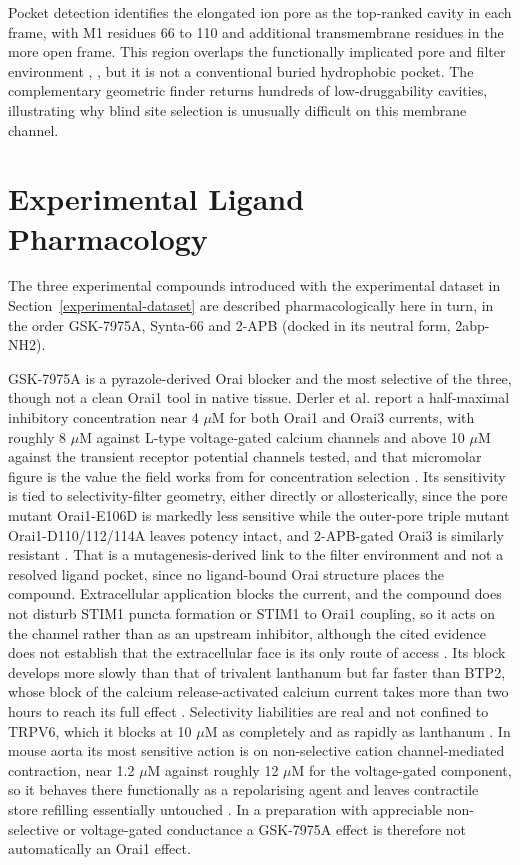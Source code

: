Pocket detection identifies the elongated ion pore as the top-ranked cavity in each frame, with M1 residues 66 to 110 and additional transmembrane residues in the more open frame. This region overlaps the functionally implicated pore and filter environment \cite{ref070}, \cite{ref071}, but it is not a conventional buried hydrophobic pocket. The complementary geometric finder returns hundreds of low-druggability cavities, illustrating why blind site selection is unusually difficult on this membrane channel.

\hypertarget{experimental-ligand-pharmacology}{%
\chapter{Experimental Ligand Pharmacology}\label{experimental-ligand-pharmacology}}

The three experimental compounds introduced with the experimental dataset in Section~\ref{experimental-dataset} are described pharmacologically here in turn, in the order GSK-7975A, Synta-66 and 2-APB (docked in its neutral form, 2abp-NH2).

GSK-7975A is a pyrazole-derived Orai blocker and the most selective of the three, though not a clean Orai1 tool in native tissue. Derler et al. report a half-maximal inhibitory concentration near 4 \ensuremath{\mu}M for both Orai1 and Orai3 currents, with roughly 8 \ensuremath{\mu}M against L-type voltage-gated calcium channels and above 10 \ensuremath{\mu}M against the transient receptor potential channels tested, and that micromolar figure is the value the field works from for concentration selection \cite{ref070}. Its sensitivity is tied to selectivity-filter geometry, either directly or allosterically, since the pore mutant Orai1-E106D is markedly less sensitive while the outer-pore triple mutant Orai1-D110/112/114A leaves potency intact, and 2-APB-gated Orai3 is similarly resistant \cite{ref070}. That is a mutagenesis-derived link to the filter environment and not a resolved ligand pocket, since no ligand-bound Orai structure places the compound. Extracellular application blocks the current, and the compound does not disturb STIM1 puncta formation or STIM1 to Orai1 coupling, so it acts on the channel rather than as an upstream inhibitor, although the cited evidence does not establish that the extracellular face is its only route of access \cite{ref070}. Its block develops more slowly than that of trivalent lanthanum \cite{ref070} but far faster than BTP2, whose block of the calcium release-activated calcium current takes more than two hours to reach its full effect \cite{ref094}. Selectivity liabilities are real and not confined to TRPV6, which it blocks at 10 \ensuremath{\mu}M as completely and as rapidly as lanthanum \cite{ref070}. In mouse aorta its most sensitive action is on non-selective cation channel-mediated contraction, near 1.2 \ensuremath{\mu}M against roughly 12 \ensuremath{\mu}M for the voltage-gated component, so it behaves there functionally as a repolarising agent and leaves contractile store refilling essentially untouched \cite{ref041}. In a preparation with appreciable non-selective or voltage-gated conductance a GSK-7975A effect is therefore not automatically an Orai1 effect.

